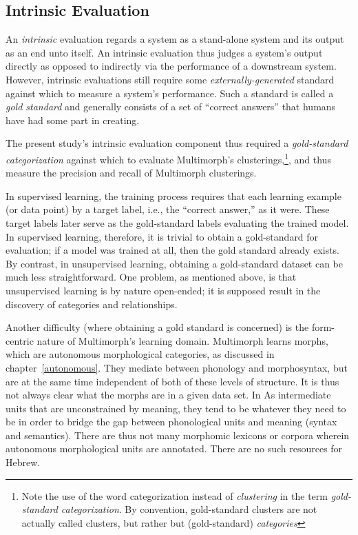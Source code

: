 \subsection{Intrinsic Evaluation}
An \emph{intrinsic} evaluation regards a system as a stand-alone system and its output as an end unto itself. An intrinsic evaluation thus judges a system's output directly as opposed to indirectly via the performance of a downstream system. However, intrinsic evaluations still require some \emph{externally-generated} standard against which to measure a system's performance. Such a standard is called a \emph{gold standard} and generally consists of a set of ``correct answers'' that humans have had some part in creating.

The present study's intrinsic evaluation component thus required a \emph{gold-standard categorization} against which to evaluate Multimorph's clusterings,\footnote{Note the use of the word {categorization} instead of \emph{clustering} in the term \emph{gold-standard categorization}. 
By convention, gold-standard clusters are not actually called clusters, but rather 
but (gold-standard) \emph{categories}}, and thus measure the precision and recall of Multimorph clusterings. 

In supervised learning, the training process requires that each learning example (or data point) by a target label, i.e., the ``correct answer,'' as it were. %
 These target labels later serve as the gold-standard labels evaluating the trained model. In supervised learning, therefore, it is trivial to obtain a gold-standard for evaluation; if a model was trained at all, then the gold standard already exists. By contrast, in unsupervised learning, obtaining a gold-standard dataset can be much less straightforward. One problem, as mentioned above, is that unsupervised learning is by nature open-ended; it is supposed result in the discovery of categories and relationships.  

Another difficulty (where obtaining a gold standard is concerned) is the 
form-centric nature of Multimorph's learning domain. Multimorph learns morphs, 
which are autonomous morphological categories, as discussed in chapter~\ref{autonomous}. 
They mediate between phonology and morphosyntax, but are at the same time independent 
of both of these levels of structure. It is thus not always clear what the morphs are in a 
given data set. In As intermediate units that are unconstrained by meaning, they tend 
to be whatever they need to be in order to bridge the gap between phonological units 
and meaning (syntax and semantics).  There are thus not many morphomic lexicons 
or corpora wherein autonomous morphological units are annotated. There are no 
such resources for Hebrew.

